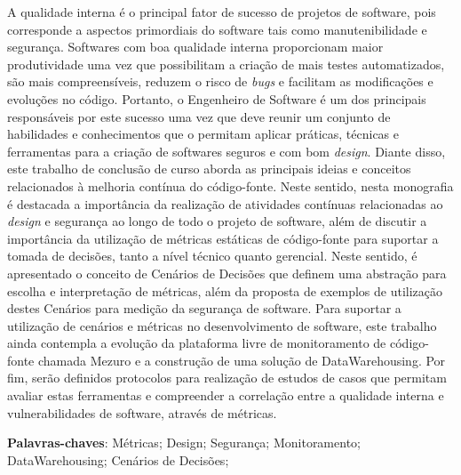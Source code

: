 \begin{resumo}

A qualidade interna é o principal fator de sucesso de projetos de software, pois corresponde a aspectos primordiais do software tais como manutenibilidade e segurança. Softwares com boa qualidade interna proporcionam maior produtividade uma vez que possibilitam a criação de mais testes automatizados, são mais compreensíveis, reduzem o risco de \emph{bugs} e facilitam as modificações e evoluções no código. Portanto, o Engenheiro de Software é um dos principais responsáveis por este sucesso uma vez que deve reunir um conjunto de habilidades e conhecimentos que o permitam aplicar práticas, técnicas e ferramentas para a criação de softwares seguros e com bom \emph{design}. Diante disso, este trabalho de conclusão de curso aborda as principais ideias e conceitos relacionados à melhoria contínua do código-fonte. Neste sentido, nesta monografia é destacada a importância da realização de atividades contínuas relacionadas ao \emph{design} e segurança ao longo de todo o projeto de software, além de discutir a importância da utilização de métricas estáticas de código-fonte para suportar a tomada de decisões, tanto a nível técnico quanto gerencial. Neste sentido, é apresentado o conceito de Cenários de Decisões que definem uma abstração para escolha e interpretação de métricas, além da proposta de exemplos de utilização destes Cenários para medição da segurança de software. Para suportar a utilização de cenários e métricas no desenvolvimento de software, este trabalho ainda contempla a evolução da plataforma livre de monitoramento de código-fonte chamada Mezuro e a construção de uma solução de DataWarehousing. Por fim, serão definidos protocolos para realização de estudos de casos que permitam avaliar estas ferramentas e compreender a correlação entre a qualidade interna e vulnerabilidades de software, através de métricas.

 \vspace{\onelineskip}
    
 \noindent
 \textbf{Palavras-chaves}: Métricas; Design; Segurança; Monitoramento; DataWarehousing; Cenários de Decisões;
\end{resumo}
